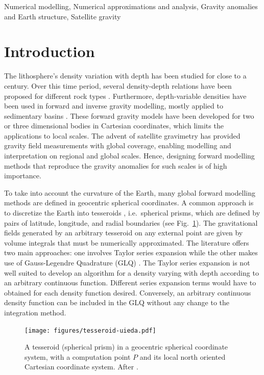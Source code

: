 \documentclass[extra, referee]{gji}
\begin{document}
\begin{keywords}
Numerical modelling, Numerical approximations and analysis, Gravity anomalies
and Earth structure, Satellite gravity
\end{keywords}


\section{Introduction}

The lithosphere's density variation with depth has been studied for close to a
century.
Over this time period,
several density-depth relations have been proposed for different rock types
\citep[e.g.][]{Maxant1980, Rao1986, Rao1993, Rao1994}.
Furthermore, depth-variable densities have been used in forward and
inverse gravity modelling, mostly applied to sedimentary basins
\citep{Cordell1973, Rao1986, Cowie1990, Rao1993, Rao1994, Zhang2001,
Welford2010}.
These forward gravity models have been developed for two or three dimensional
bodies in Cartesian coordinates, which limits the applications to local scales.
The advent of satellite gravimetry has provided gravity field
measurements with global coverage, enabling modelling and interpretation on regional and
global scales.
Hence, designing forward modelling methods that reproduce the gravity anomalies for
such scales is of high importance.

To take into account the curvature of the Earth, many global forward modelling methods
are defined in geocentric spherical coordinates.
A common approach is to discretize the Earth into tesseroids \citep{Anderson1976},
i.e.~spherical prisms, which are defined by pairs of latitude, longitude, and radial
boundaries (see Fig.~\ref{fig:tesseroid}).
The gravitational fields generated by an arbitrary
tesseroid on any external point are given by volume
integrals that must be numerically approximated.
The literature offers two main approaches: one involves Taylor series expansion
\citep{Heck2007, Grombein2013} while the other makes use of Gauss-Legendre
Quadrature (GLQ)
\citep{Asgharzadeh2007, Wild-Pfeiffer2008, Li2011, Uieda2016}.
The Taylor series expansion is not well suited to develop an algorithm for
a density varying with depth according to an arbitrary continuous function.
Different series expansion terms would have to obtained for each density function
desired.
Conversely, an arbitrary continuous density function can be included in the GLQ without
any change to the integration method.

\begin{figure}
\centering
\texttt{[image: figures/tesseroid-uieda.pdf]}
\caption{
    A tesseroid (spherical prism) in a geocentric spherical coordinate system, with a
    computation point $P$ and its local north oriented Cartesian coordinate system.
    After \citet{Uieda2015}.
}
\label{fig:tesseroid}
\end{figure}
\end{document}
